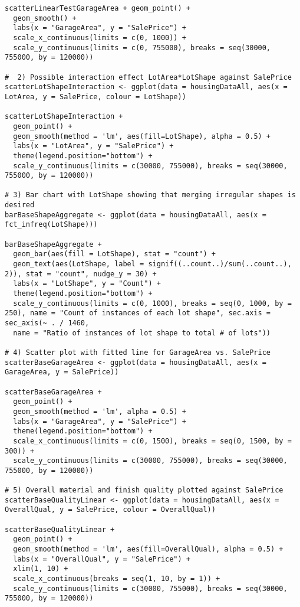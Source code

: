 \documentclass{article}
\begin{document}
\begin{tiny}
\begin{verbatim}
scatterLinearTestGarageArea + geom_point() + 
  geom_smooth() + 
  labs(x = "GarageArea", y = "SalePrice") +
  scale_x_continuous(limits = c(0, 1000)) +
  scale_y_continuous(limits = c(0, 755000), breaks = seq(30000, 755000, by = 120000))

#  2) Possible interaction effect LotArea*LotShape against SalePrice
scatterLotShapeInteraction <- ggplot(data = housingDataAll, aes(x = LotArea, y = SalePrice, colour = LotShape))

scatterLotShapeInteraction +
  geom_point() +
  geom_smooth(method = 'lm', aes(fill=LotShape), alpha = 0.5) +
  labs(x = "LotArea", y = "SalePrice") +  
  theme(legend.position="bottom") +
  scale_y_continuous(limits = c(30000, 755000), breaks = seq(30000, 755000, by = 120000))

# 3) Bar chart with LotShape showing that merging irregular shapes is desired
barBaseShapeAggregate <- ggplot(data = housingDataAll, aes(x = fct_infreq(LotShape)))

barBaseShapeAggregate + 
  geom_bar(aes(fill = LotShape), stat = "count") +
  geom_text(aes(LotShape, label = signif((..count..)/sum(..count..), 2)), stat = "count", nudge_y = 30) +
  labs(x = "LotShape", y = "Count") +
  theme(legend.position="bottom") +
  scale_y_continuous(limits = c(0, 1000), breaks = seq(0, 1000, by = 250), name = "Count of instances of each lot shape", sec.axis = sec_axis(~ . / 1460, 
  name = "Ratio of instances of lot shape to total # of lots"))

# 4) Scatter plot with fitted line for GarageArea vs. SalePrice
scatterBaseGarageArea <- ggplot(data = housingDataAll, aes(x = GarageArea, y = SalePrice))

scatterBaseGarageArea +
  geom_point() +
  geom_smooth(method = 'lm', alpha = 0.5) +
  labs(x = "GarageArea", y = "SalePrice") +
  theme(legend.position="bottom") +
  scale_x_continuous(limits = c(0, 1500), breaks = seq(0, 1500, by = 300)) +
  scale_y_continuous(limits = c(30000, 755000), breaks = seq(30000, 755000, by = 120000))

# 5) Overall material and finish quality plotted against SalePrice
scatterBaseQualityLinear <- ggplot(data = housingDataAll, aes(x = OverallQual, y = SalePrice, colour = OverallQual))

scatterBaseQualityLinear +
  geom_point() +
  geom_smooth(method = 'lm', aes(fill=OverallQual), alpha = 0.5) +
  labs(x = "OverallQual", y = "SalePrice") +
  xlim(1, 10) +
  scale_x_continuous(breaks = seq(1, 10, by = 1)) +
  scale_y_continuous(limits = c(30000, 755000), breaks = seq(30000, 755000, by = 120000))


\end{verbatim}
\end{tiny}
\end{document}
